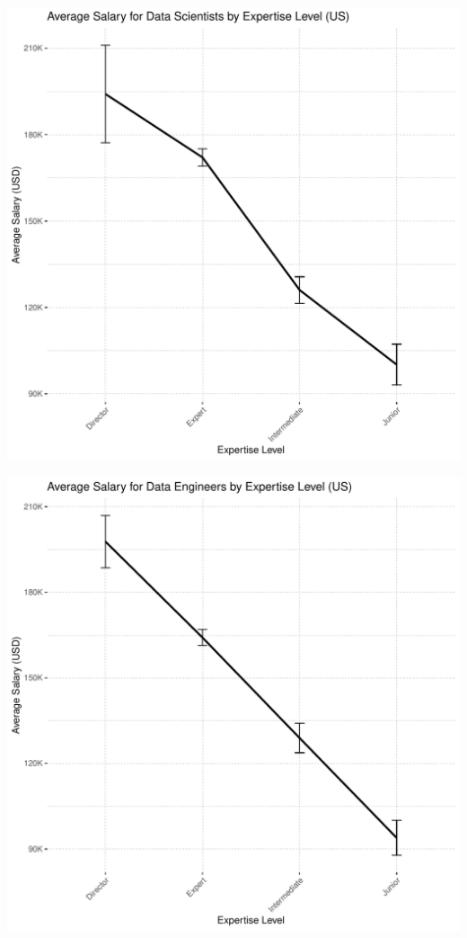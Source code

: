 \documentclass{article}\usepackage[]{graphicx}\usepackage[]{xcolor}
\makeatletter
\def\maxwidth{ %
  \ifdim\Gin@nat@width>\linewidth
    \linewidth
  \else
    \Gin@nat@width
  \fi
}
\newenvironment{knitrout}{}{} %
\makeatother
\begin{document}
\begin{knitrout}
\color{fgcolor}
\includegraphics[width=\maxwidth]{figure/unnamed-chunk-2-1} 

\includegraphics[width=\maxwidth]{figure/unnamed-chunk-2-2} 


\end{knitrout}
\end{document}

